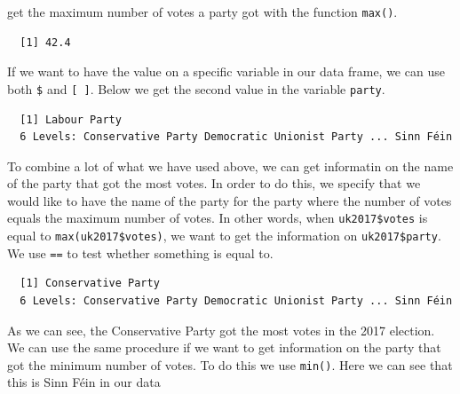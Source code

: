 \documentclass[12pt,oneside]{reedthesis}
\theoremstyle{definition}
\theoremstyle{definition}
\theoremstyle{definition}
\theoremstyle{remark}
\begin{document}
  get the maximum number of votes a party got with the function
  \texttt{max()}.
  \begin{Shaded}
  \begin{Highlighting}[]
  \OperatorTok{$}
  \end{Highlighting}
  \end{Shaded}
  \begin{verbatim}
  [1] 42.4
  \end{verbatim}
  If we want to have the value on a specific variable in our data frame,
  we can use both \texttt{\$} and \texttt{{[}\ {]}}. Below we get the
  second value in the variable \texttt{party}.
  \begin{Shaded}
  \begin{Highlighting}[]
  \OperatorTok{$}\NormalTok{party[}\NormalTok{]}
  \end{Highlighting}
  \end{Shaded}
  \begin{verbatim}
  [1] Labour Party
  6 Levels: Conservative Party Democratic Unionist Party ... Sinn Féin
  \end{verbatim}
  To combine a lot of what we have used above, we can get informatin on
  the name of the party that got the most votes. In order to do this, we
  specify that we would like to have the name of the party for the party
  where the number of votes equals the maximum number of votes. In other
  words, when \texttt{uk2017\$votes} is equal to
  \texttt{max(uk2017\$votes)}, we want to get the information on
  \texttt{uk2017\$party}. We use \texttt{==} to test whether something is
  equal to.
  \begin{Shaded}
  \begin{Highlighting}[]
  \OperatorTok{$}\NormalTok{party[uk2017}\OperatorTok{$}\OperatorTok{==}\StringTok{ }\OperatorTok{$}\NormalTok{votes)]}
  \end{Highlighting}
  \end{Shaded}
  \begin{verbatim}
  [1] Conservative Party
  6 Levels: Conservative Party Democratic Unionist Party ... Sinn Féin
  \end{verbatim}
  As we can see, the Conservative Party got the most votes in the 2017
  election. We can use the same procedure if we want to get information on
  the party that got the minimum number of votes. To do this we use
  \texttt{min()}. Here we can see that this is Sinn Féin in our data
\end{document}
